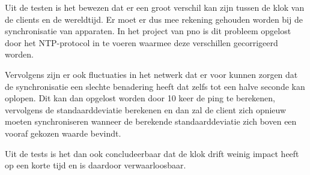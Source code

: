 Uit de testen is het bewezen dat er een groot verschil kan zijn tussen de klok van de clients en de wereldtijd. Er moet er dus mee rekening gehouden worden bij de synchronisatie van apparaten. In het project van pno is dit probleem opgelost door het NTP-protocol in te voeren waarmee deze verschillen gecorrigeerd worden.

Vervolgens zijn er ook fluctuaties in het netwerk dat er voor kunnen zorgen dat de synchronisatie een slechte benadering heeft dat zelfs tot een halve seconde kan oplopen. Dit kan dan opgelost worden door 10 keer de ping te berekenen, vervolgens de standaarddeviatie berekenen en dan zal de client zich opnieuw moeten synchroniseren wanneer de berekende standaarddeviatie zich boven een vooraf gekozen waarde bevindt.

Uit de tests is het dan ook concludeerbaar dat de klok drift weinig impact heeft op een korte tijd en is daardoor verwaarloosbaar.


